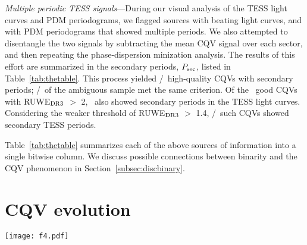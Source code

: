 \documentclass[11pt,twocolumn,tighten]{aastex63}
\begin{document}
{\it Multiple periodic TESS signals}---During our visual analysis of
the TESS light curves and PDM periodograms, we flagged sources with
beating light curves, and with PDM periodograms that showed multiple
periods.  We also attempted to disentangle the two signals by
subtracting the mean CQV signal over each sector, and then repeating
the phase-dispersion minization analysis.  The results of this effort
are summarized in the secondary periods, $P_{\rm sec}$, listed in
Table~\ref{tab:thetable}.  This process yielded
\ngoodmultperiodflag/\ngoods\ high-quality CQVs with secondary
periods; \nmaybemultperiodflag/\nmaybes\ of the ambiguous sample met
the same criterion.  Of the \ngoodhighruwe\ good CQVs with RUWE$_{\rm
DR3}$ $>$ 2, \ngoodruweandmultperiod\ also showed secondary periods in
the TESS light curves.  Considering the weaker threshold of RUWE$_{\rm
DR3}$ $>$ 1.4, \ngoodweakruweandmultperiod/\ngoodweakruwe\ such CQVs
showed secondary TESS periods.

Table~\ref{tab:thetable} summarizes each of the above sources of
information into a single bitwise column.  We discuss possible
connections between binarity and the CQV phenomenon in
Section~\ref{subsec:discbinary}.


\section{CQV evolution}
\label{sec:evoln}

\begin{figure*}[!tp]
	\begin{center}
		\centering
		\texttt{[image: f4.pdf]}
		\vspace{-0.6cm}
		\caption{
			{\bf CQVs keep their periods but change their shapes.}
			Out of the \ngoods\ CQVs in Figure~\ref{fig:cqvs}, 32 had
			120-second cadence TESS data available for a baseline of at
			least two years; the 27 brightest are shown here due to space
			constraints.  Each panel shows one sector of TESS data, and is
			phased to its deepest minimum in flux.  Each panel's title shows
			the TIC identifier and approximate period in hours.  Text insets
			show the TESS sector numbers, which generally span two years, or
			at least 1{,}000 cycles.  The vertical scale is fixed across
			sectors to clarify shape changes.  Gray circles are raw 2-minute
			data; colored circles bin to 300 points per cycle. 
		}
		\label{fig:evoln}
	\end{center}
\end{figure*}
\end{document}
